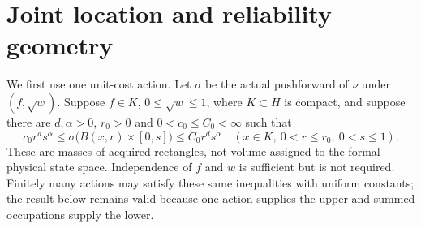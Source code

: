 \section{Joint location and reliability geometry}\label{sec:geometry}
We first use one unit-cost action. Let $\sigma$ be the actual pushforward of $\nu$ under $(f,\sqrt w)$. Suppose $f\in K$, $0\le\sqrt w\le1$, where $K\subset H$ is compact, and suppose there are $d,\alpha>0$, $r_0>0$ and $0<c_0\le C_0<\infty$ such that
\begin{equation}\label{eq:rectangle-mass}
 c_0r^ds^\alpha\le
 \sigma\bigl(B(x,r)\times[0,s]\bigr)
 \le C_0r^ds^\alpha
 \quad(x\in K,
\ 0<r\le r_0,
\ 0<s\le1).
\end{equation}
These are masses of acquired rectangles, not volume assigned to the formal physical state space. Independence of $f$ and $w$ is sufficient but is not required. Finitely many actions may satisfy these same inequalities with uniform constants; the result below remains valid because one action supplies the upper and summed occupations supply the lower.

